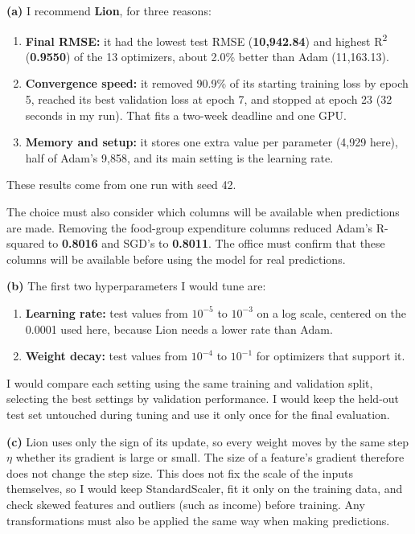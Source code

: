 \documentclass[12pt,a4paper]{article}
\begin{document}
\begin{answerbox}
\textbf{(a)} I recommend \textbf{Lion}, for three reasons:
\begin{enumerate}
\item \textbf{Final RMSE:} it had the lowest test RMSE (\textbf{10,942.84}) and highest R\textsuperscript{2} (\textbf{0.9550}) of the 13 optimizers, about 2.0\% better than Adam (11,163.13).
\item \textbf{Convergence speed:} it removed 90.9\% of its starting training loss by epoch 5, reached its best validation loss at epoch 7, and stopped at epoch 23 (32 seconds in my run). That fits a two-week deadline and one GPU.
\item \textbf{Memory and setup:} it stores one extra value per parameter (4,929 here), half of Adam's 9,858, and its main setting is the learning rate.
\end{enumerate}
These results come from one run with seed 42.

The choice must also consider which columns will be available when predictions are made. Removing the food-group expenditure columns reduced Adam's R-squared to \textbf{0.8016} and SGD's to \textbf{0.8011}. The office must confirm that these columns will be available before using the model for real predictions.

\textbf{(b)} The first two hyperparameters I would tune are:
\begin{enumerate}
\item \textbf{Learning rate:} test values from \(10^{-5}\) to \(10^{-3}\) on a log scale, centered on the 0.0001 used here, because Lion needs a lower rate than Adam.
\item \textbf{Weight decay:} test values from \(10^{-4}\) to \(10^{-1}\) for optimizers that support it.
\end{enumerate}
I would compare each setting using the same training and validation split, selecting the best settings by validation performance. I would keep the held-out test set untouched during tuning and use it only once for the final evaluation.

\textbf{(c)} Lion uses only the sign of its update, so every weight moves by the same step \(\eta\) whether its gradient is large or small. The size of a feature's gradient therefore does not change the step size. This does not fix the scale of the inputs themselves, so I would keep StandardScaler, fit it only on the training data, and check skewed features and outliers (such as income) before training. Any transformations must also be applied the same way when making predictions.
\end{answerbox}
\end{document}

